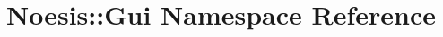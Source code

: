 \hypertarget{namespace_noesis_1_1_gui}{\section{Noesis\-:\-:Gui Namespace Reference}
\label{namespace_noesis_1_1_gui}
}
